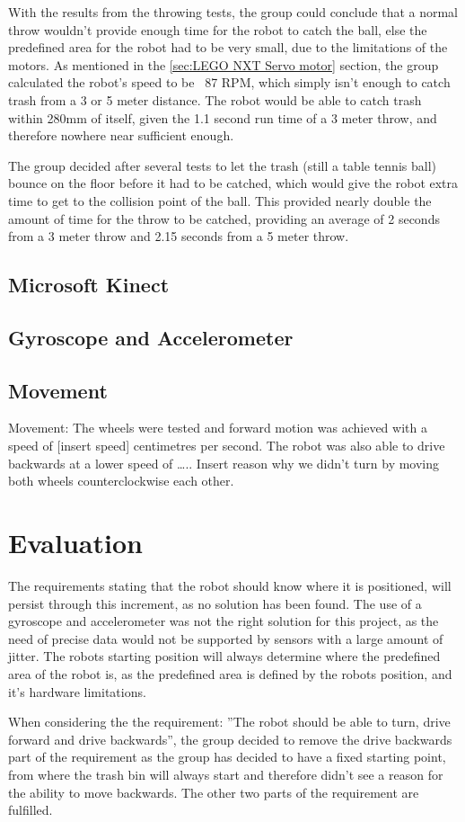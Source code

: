 With the results from the throwing tests, the group could conclude that a normal throw wouldn't provide enough time for the robot to catch the ball, else the predefined area for the robot had to be very small, due to the limitations of the motors. As mentioned in the \ref{sec:LEGO NXT Servo motor} section, the group calculated the robot's speed to be ~87 RPM, which simply isn't enough to catch trash from a 3 or 5 meter distance. The robot would be able to catch trash within 280mm of itself, given the 1.1 second run time of a 3 meter throw, and therefore nowhere near sufficient enough. 

The group decided after several tests to let the trash (still a table tennis ball) bounce on the floor before it had to be catched, which would give the robot extra time to get to the collision point of the ball. This provided nearly double the amount of time for the throw to be catched, providing an average of 2 seconds from a 3 meter throw and 2.15 seconds from a 5 meter throw.

\subsection{Microsoft Kinect}
\label{sec:i1Microsoft KinectImplementation}

\subsection{Gyroscope and Accelerometer}
\label{sec:i1Gyroscope and AccelerometerImplementation}

\subsection{Movement}
\label{sec:i1MovementImplementation}
Movement: The wheels were tested and forward motion was achieved with a speed of [insert speed] centimetres per second. The robot was also able to drive backwards at a lower speed of ….. Insert reason why we didn't turn by moving both wheels counterclockwise each other. 


\section{Evaluation}
\label{sec:i1Evaluation}
The requirements stating that the robot should know where it is positioned, will persist through this increment, as no solution has been found. The use of a gyroscope and accelerometer was not the right solution for this project, as the need of precise data would not be supported by sensors with a large amount of jitter. The robots starting position will always determine where the predefined area of the robot is, as the predefined area is defined by the robots position, and it's hardware limitations.

When considering the the requirement: ”The robot should be able to turn, drive forward and drive backwards”, the group decided to remove the drive backwards part of the requirement as the group has decided to have a fixed starting point, from where the trash bin will always start and therefore didn’t see a reason for the ability to move backwards.
The other two parts of the requirement are fulfilled.
